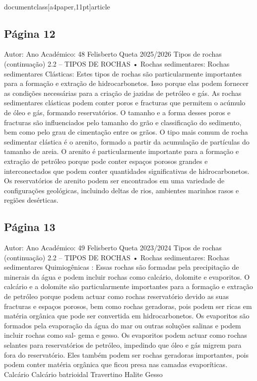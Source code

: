 \\documentclass[a4paper,11pt]{article}
\begin{document}
\subsection*{Página 12}
Autor:
Ano Académico:
48
Felisberto Queta
2025/2026
Tipos de rochas (continuação)
2.2 – TIPOS DE ROCHAS
•
Rochas sedimentares: 
Rochas sedimentares Clásticas: 
Estes tipos de rochas são particularmente importantes para a
formação e extração de hidrocarbonetos. Isso porque elas
podem fornecer as condições necessárias para a criação de
jazidas de petróleo e gás. As rochas sedimentares clásticas
podem conter poros e fracturas que permitem o acúmulo de
óleo e gás, formando reservatórios. O tamanho e a forma
desses poros e fracturas são influenciados pelo tamanho do
grão e classificação do sedimento, bem como pelo grau de
cimentação entre os grãos.
O tipo mais comum de rocha sedimentar clástica é o arenito,
formado a partir da acumulação de partículas do tamanho de
areia. O arenito é particularmente importante para a formação
e extração de petróleo porque pode conter espaços porosos
grandes e interconectados que podem conter quantidades
significativas de hidrocarbonetos. Os reservatórios de arenito
podem ser encontrados em uma variedade de configurações
geológicas, incluindo deltas de rios, ambientes marinhos
rasos e regiões desérticas.



\subsection*{Página 13}
Autor:
Ano Académico:
49
Felisberto Queta
2023/2024
Tipos de rochas (continuação)
2.2 – TIPOS DE ROCHAS
•
Rochas sedimentares: 
Rochas sedimentares Quimiogênicas : 
Essas rochas são formadas pela precipitação de minerais da
água e podem incluir rochas como calcário, dolomite e
evaporitos. O calcário e a dolomite são particularmente
importantes para a formação e extração de petróleo porque
podem
actuar
como
rochas
reservatório
devido
as
suas
fracturas e espaços porosos, bem como rochas geradoras, pois
podem ser ricas em matéria orgânica que pode ser convertida
em hidrocarbonetos.
Os evaporitos são formados pela evaporação da água do mar
ou outras soluções salinas e podem incluir rochas como sal-
gema e gesso. Os evaporitos podem actuar como rochas
selantes para reservatórios de petróleo, impedindo que óleo e
gás migrem para fora do reservatório. Eles também podem ser
rochas geradoras importantes, pois podem conter matéria
orgânica que ficou presa nas camadas evaporíticas.
Calcário
Calcário 
batrioidal
Travertino
Halite
Gesso
\end{document}
